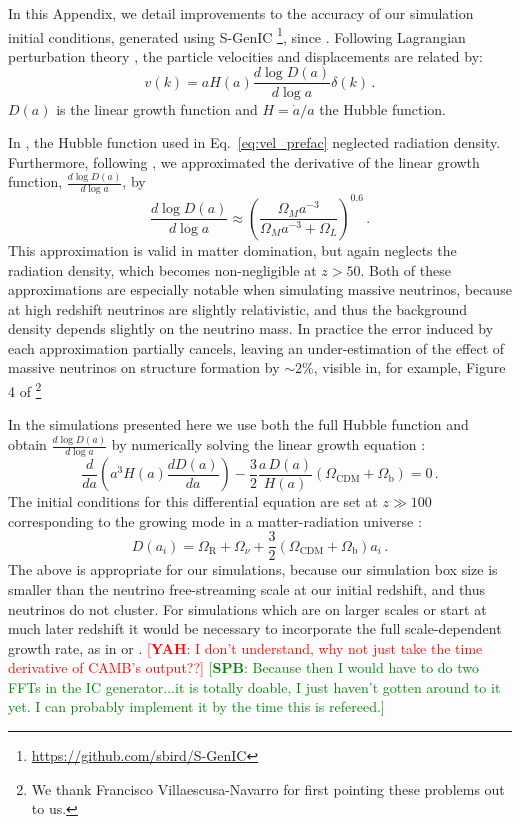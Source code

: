 \documentclass[useAMS, usenatbib]{mnras}
\newcommand{\spb}[1]{{\textcolor{green}{[{\bf SPB}: #1]}}}
\newcommand{\yah}[1]{{\textcolor{red}{[{\bf YAH}: #1]}}}
\begin{document}
In this Appendix, we detail improvements to the accuracy of our simulation initial conditions, generated using S-GenIC \footnote{\url{https://github.com/sbird/S-GenIC}}, since \cite{AHB}.
Following Lagrangian perturbation theory \citep{Zeldovich_1970, Scoccimarro_1998},
the particle velocities and displacements are related by:
\begin{equation}
v(k) = a H(a) \frac{d \log D(a)}{d \log a} \delta(k)\,.
\label{eq:vel_prefac}
\end{equation}
$D(a)$ is the linear growth function and $H = \dot{a}/a$ the Hubble function.

In \cite{AHB}, the Hubble function used in Eq.~\ref{eq:vel_prefac}
neglected radiation density. Furthermore, following \cite{Bouchet:1995}, we
approximated the derivative of the linear growth function, $\frac{d \log D(a)}{d \log a}$, by
\begin{equation}
\frac{d \log D(a)}{d \log a} \approx \left(\frac{\Omega_M a^{-3}}{\Omega_M  a^{-3} + \Omega_L}\right)^{0.6}\,.
\end{equation}
This approximation is valid in matter domination, but again neglects the radiation density,
which becomes non-negligible at $z > 50$. Both of these approximations are especially notable
when simulating massive neutrinos, because at high redshift neutrinos are slightly relativistic,
and thus the background density depends slightly on the neutrino mass. In practice the error
induced by each approximation partially cancels, leaving an under-estimation of the effect of
massive neutrinos on structure formation by $\sim 2 \%$, visible in, for example,
Figure 4 of \cite{AHB}\footnote{We thank Francisco Villaescusa-Navarro for first pointing these problems out to us.}

In the simulations presented here we use both the full Hubble function
and obtain $\frac{d \log D(a)}{d \log a}$ by numerically solving
the linear growth equation \citep{Peebles:1993}:
\begin{equation}
\frac{d}{da}\left(a^3 H(a) \frac{d D(a)}{da}\right) - \frac{3}{2} \frac{a \,D(a)}{H(a)} \left(\Omega_\mathrm{CDM} + \Omega_\mathrm{b}\right)= 0\,.
\end{equation}
The initial conditions for this differential equation are set at $z \gg 100$ corresponding
to the growing mode in a matter-radiation universe \citep{Groth:1975}:
\begin{equation}
  D(a_i) = \Omega_\mathrm{R} + \Omega_\nu + \frac{3}{2} \left(\Omega_\mathrm{CDM} + \Omega_\mathrm{b}\right) a_i\,.
\end{equation}
The above is appropriate for our simulations, because our simulation box size is smaller than the neutrino free-streaming scale at our initial redshift, and thus neutrinos do not cluster. For simulations which are on larger scales or start at much later redshift it would be necessary to incorporate the full scale-dependent growth rate, as in \cite{Zennaro_2017} or \cite{OLeary_2012}. \yah{I don't understand, why not just take the time derivative of CAMB's output??} \spb{Because then I would have to do two FFTs in the IC generator...it is totally doable, I just haven't gotten around to it yet. I can probably implement it by the time this is refereed.}
\end{document}
